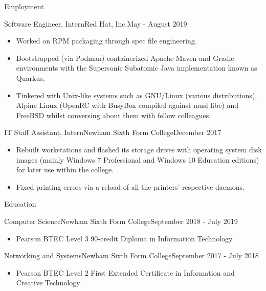 \documentclass[]{mcdowellcv}
\begin{document}
	\makeheader

	\begin{cvsection}{Employment}
		\begin{cvsubsection}{Software Engineer, Intern}{Red Hat, Inc.}{May - August 2019}
			\begin{itemize}
				\item Worked on RPM packaging through spec file engineering.
				\item Bootstrapped (via Podman) containerized Apache Maven and Gradle environments with the Supersonic Subatomic Java implementation known as Quarkus.
				\item Tinkered with Unix-like systems such as GNU/Linux (various distributions), Alpine Linux (OpenRC with BusyBox compiled against musl libc) and FreeBSD whilst conversing about them with fellow colleagues.
			\end{itemize}
		\end{cvsubsection}
		\begin{cvsubsection}{IT Staff Assistant, Intern}{Newham Sixth Form College}{December 2017}
			\begin{itemize}
				\item Rebuilt workstations and flashed its storage drives with operating system disk images (mainly Windows 7 Professional and Windows 10 Education editions) for later use within the college.
				\item Fixed printing errors via a reload of all the printers' respective daemons.
			\end{itemize}
		\end{cvsubsection}
	\end{cvsection}

	\begin{cvsection}{Education}
		\begin{cvsubsection}{Computer Science}{Newham Sixth Form College}{September 2018 - July 2019}
			\begin{itemize}
				\item Pearson BTEC Level 3 90-credit Diploma in Information Technology
			\end{itemize}
		\end{cvsubsection}

		\begin{cvsubsection}{Networking and Systems}{Newham Sixth Form College}{September 2017 - July 2018}
			\begin{itemize}
				\item Pearson BTEC Level 2 First Extended Certificate in Information and Creative Technology
			\end{itemize}
		\end{cvsubsection}
	\end{cvsection}
\end{document}

